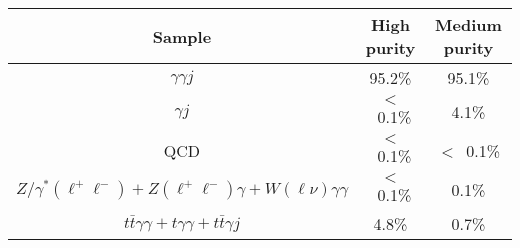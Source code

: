 \begin{tabular}{|c|c|c|}
\hline
Sample & High purity & Medium purity\\
\hline
$\gamma\gamma j$                      & 95.2\%  &  95.1\%   \\
$\gamma j$                            & $<$~0.1\% &  4.1\%  \\
QCD                                   & $<$~0.1\% &  $<$~0.1\% \\
$Z/\gamma^*(\ell^+\ell^-) + Z(\ell^+\ell^-)\gamma + W(\ell\nu)\gamma\gamma$ & $<$~0.1\% & 0.1\% \\
$t\bar{t}\gamma\gamma + t\gamma\gamma + t\bar{t}\gamma j$ & 4.8\% &  0.7\% \\
\hline
\end{tabular}
